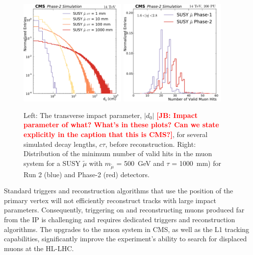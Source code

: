 \begin{figure}[t]\begin{center}
\includegraphics[width=0.47\textwidth]{figures/Stage0h1_0_d0_smuon_daughter}
\includegraphics[width=0.47\textwidth]{figures/MuonHitsEndcap}
\caption{
Left: The transverse impact parameter, $|d_{0}|$ {\bf \textcolor{red}{[JB: Impact parameter of what?  What's in these plots?  Can we state explicitly in the caption that this is CMS?]}}, for several simulated decay lengths, $c\tau$, before reconstruction.
Right: Distribution of the minimum number of valid hits in the muon system for a SUSY $\widetilde{\mu}$ with $m_{\widetilde{\mu}}$ = 500~GeV and $\tau$ = 1000~mm) for Run 2 (blue) and Phase-2 (red) detectors. 
}
\label{fig:perfDisplaced}
\end{center}
\end{figure}

Standard triggers and reconstruction algorithms that use the position of the primary vertex will not efficiently reconstruct tracks with large impact parameters. Consequently, triggering on and reconstructing muons produced far  from the IP is challenging and requires dedicated triggers and reconstruction algorithms. The upgrades to the muon system in CMS, as well as the L1 tracking capabilities, significantly improve the experiment's ability to search for displaced muons at the HL-LHC. 

